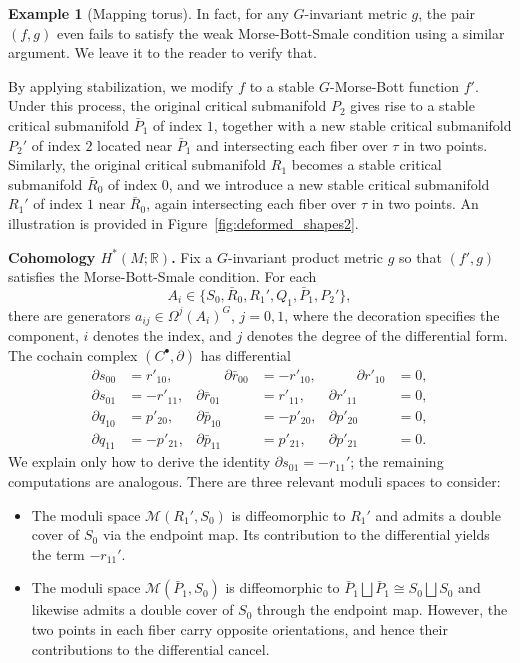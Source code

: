 \documentclass[11pt]{amsart}
\theoremstyle{definition}
\newtheorem{example}[theorem]{Example}
\numberwithin{equation}{subsection}
\newcommand{\R}{\mathbb{R}}
\newcommand{\p}{\partial}
\begin{document}
\begin{example}[Mapping torus]
        In fact, for any $G$-invariant metric $g$, the pair $(f,g)$ even fails to satisfy the weak Morse-Bott-Smale condition using a similar argument. We leave it to the reader to verify that.
		
		By applying stabilization, we modify $f$ to a stable $G$-Morse-Bott function $f'$. Under this process, the original critical submanifold $P_2$ gives rise to a stable critical submanifold $\bar{P}_1$ of index $1$, together with a new stable critical submanifold $P_2'$ of index $2$ located near $\bar{P}_1$ and intersecting each fiber over $\tau$ in two points. Similarly, the original critical submanifold $R_1$ becomes a stable critical submanifold $\bar{R}_0$ of index $0$, and we introduce a new stable critical submanifold $R_1'$ of index $1$ near $\bar{R}_0$, again intersecting each fiber over $\tau$ in two points. An illustration is provided in Figure~\ref{fig:deformed_shapes2}.

\medskip
\noindent\textbf{Cohomology \(H^*(M;\R)\).}
Fix a $G$-invariant product metric $g$ so that $(f',g)$ satisfies the Morse-Bott-Smale condition. For each
\[
A_i \in \{S_0,\bar R_0,R_1',Q_1,\bar P_1,P_2'\},
\]
there are generators $a_{ij}\in\Omega^j(A_i)^G$, $j=0,1$, where the decoration specifies the component, $i$ denotes the index, and $j$ denotes the degree of the differential form. The cochain complex $(C^\bullet,\p)$ has differential
\[
\begin{aligned}
\p s_{00}      &=  r'_{10}, &\qquad
\p \bar r_{00} &=  -r'_{10}, &\qquad
\p r'_{10}     &= 0, \\
\p s_{01}      &= - r'_{11},&
\p \bar r_{01} &=  r'_{11},&
\p r'_{11}     &= 0, \\
\p q_{10}      &=  p'_{20},&
\p \bar p_{10} &= - p'_{20},&
\p p'_{20}     &= 0, \\
\p q_{11}      &= - p'_{21},&
\p \bar p_{11} &=  p'_{21},&
\p p'_{21}     &= 0.
\end{aligned}
\]
We explain only how to derive the identity $\partial s_{01}=-r_{11}'$; the 
remaining computations are analogous. There are three relevant moduli spaces to 
consider:
\begin{itemize}
  \item The moduli space $\mathcal{M}(R_1',S_0)$ is diffeomorphic to $R_1'$ and 
  admits a double cover of $S_0$ via the endpoint map. Its contribution 
  to the differential yields the term $-r_{11}'$.
  
  \item The moduli space $\mathcal{M}(\bar P_1,S_0)$ is diffeomorphic to 
  $\bar P_1 \bigsqcup \bar P_1 \cong S_0 \bigsqcup S_0$ and likewise admits a double 
  cover of $S_0$ through the endpoint map. However, the two points in each fiber 
  carry opposite orientations, and hence their contributions to the differential 
  cancel.
  

\end{itemize}
\end{example}
\end{document}
